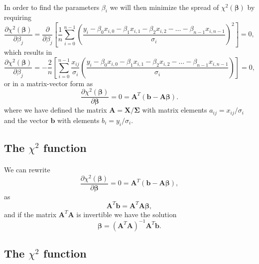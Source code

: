 \documentclass[%
oneside,                 %
final,                   %
10pt]{article}
\begin{document}
\paragraph{}

In order to find the parameters $\beta_i$ we will then minimize the spread of $\chi^2(\bm{\beta})$ by requiring
\[
\frac{\partial \chi^2(\bm{\beta})}{\partial \beta_j} = \frac{\partial }{\partial \beta_j}\left[ \frac{1}{n}\sum_{i=0}^{n-1}\left(\frac{y_i-\beta_0x_{i,0}-\beta_1x_{i,1}-\beta_2x_{i,2}-\dots-\beta_{n-1}x_{i,n-1}}{\sigma_i}\right)^2\right]=0, 
\]
which results in
\[
\frac{\partial \chi^2(\bm{\beta})}{\partial \beta_j} = -\frac{2}{n}\left[ \sum_{i=0}^{n-1}\frac{x_{ij}}{\sigma_i}\left(\frac{y_i-\beta_0x_{i,0}-\beta_1x_{i,1}-\beta_2x_{i,2}-\dots-\beta_{n-1}x_{i,n-1}}{\sigma_i}\right)\right]=0, 
\]
or in a matrix-vector form as
\[
\frac{\partial \chi^2(\bm{\beta})}{\partial \bm{\beta}} = 0 = \bm{A}^T\left( \bm{b}-\bm{A}\bm{\beta}\right).  
\]
where we have defined the matrix $\bm{A} =\bm{X}/\bm{\Sigma}$ with matrix elements $a_{ij} = x_{ij}/\sigma_i$ and the vector $\bm{b}$ with elements $b_i = y_i/\sigma_i$.



\subsection{The $\chi^2$ function}

\paragraph{}

We can rewrite
\[
\frac{\partial \chi^2(\bm{\beta})}{\partial \bm{\beta}} = 0 = \bm{A}^T\left( \bm{b}-\bm{A}\bm{\beta}\right),  
\]
as
\[
\bm{A}^T\bm{b} = \bm{A}^T\bm{A}\bm{\beta},  
\]
and if the matrix $\bm{A}^T\bm{A}$ is invertible we have the solution
\[
\bm{\beta} =\left(\bm{A}^T\bm{A}\right)^{-1}\bm{A}^T\bm{b}.
\]



\subsection{The $\chi^2$ function}

\paragraph{}
\end{document}
